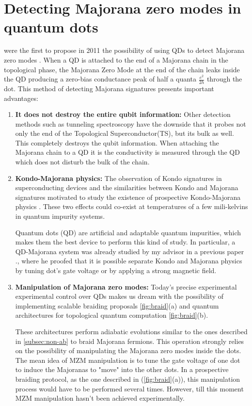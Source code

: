 \section{Detecting Majorana zero modes in quantum dots}

\citeauthor{liu_detecting_2011} were the first to propose in 2011 the possibility of using QDs to detect Majorana zero modes \cite{liu_detecting_2011} . When a QD is attached to the end of a Majorana chain in the topological phase,  the Majorana Zero Mode at the end of the chain leaks inside the QD \cite{vernek_subtle_2014} producing a zero-bias conductance peak of half a quanta $\frac{e^{2}}{2h}$ through the dot. This method of detecting Majorana signatures presents important advantages:

\begin{enumerate}
  \item \textbf{It does not destroy the entire qubit information:} Other detection methods such as tunneling spectroscopy have the downside that it probes not only the end of the Topological Superconductor(TS), but its bulk as well. This completely destroys the qubit information. When attaching the Majorana chain to a QD it is the conductivity is measured through the QD which does not disturb the bulk of the chain. 
  \item \textbf{Kondo-Majorana physics:} The observation of Kondo signatures in superconducting devices \cite{lee_zero-bias_2012} and the similarities between Kondo and Majorana signatures \cite{vernek_subtle_2014}  motivated to study the  existence of prospective Kondo-Majorana physics \cite{lee_kondo_2013,gorski_interplay_2018}. 
  These two effects could co-exist at temperatures of a few mili-kelvins in quantum impurity systems.

   Quantum dots (QD) are artificial and adaptable quantum impurities, which makes them the best device to perform this kind of study. In particular, a QD-Majorana system was already studied by my advisor in a previous paper \citep{ruiz-tijerina_interaction_2015}., where he proofed that it is possible separate Kondo and Majorana physics by tuning dot's gate voltage or by applying a strong magnetic field. 
  \item \textbf{Manipulation of Majorana zero modes:} Today's precise experimental experimental control over QDs makes us dream with the possibility of implementing scalable braiding proposals \ref{fig:braid}(a) and  quantum architectures for topological quantum computation \ref{fig:braid}(b). 

    These architectures perform adiabatic evolutions similar to the ones described in  \ref{subsec:non-ab} to braid Majorana fermions. This operation strongly relies on the possibility of manipulating the Majorana zero modes inside the dots. The mean idea of MZM manipulation is to  tune the gate voltage of one dot to induce the Majoranas to "move" into the other dots.  In a prospective braiding protocol, as the one described in  \cite{malciu_braiding_2018} (\ref{fig:braid}(a)), this manipulation process would have to be performed several times. However, till this moment MZM manipulation hasn't been achieved experimentally. 

\end{enumerate}

